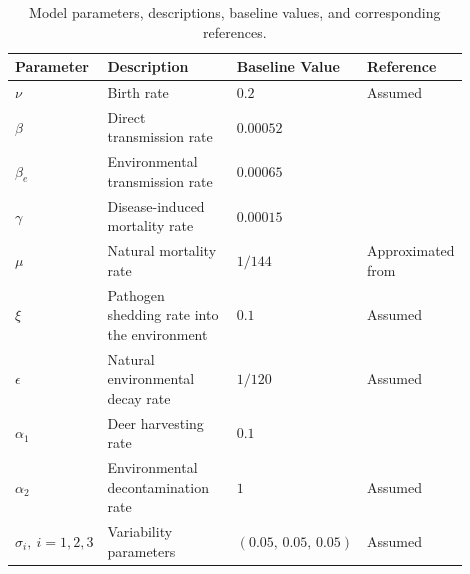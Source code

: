 \documentclass[12pt,a4paper,reqno]{amsart}
\theoremstyle{definition}
\theoremstyle{remark}
\theoremstyle{plain}
\begin{document}
\begin{table}[H]
\centering
\caption{Model parameters, descriptions, baseline values, and corresponding references.}
\label{tab:parameters}

\begin{tabular}{|p{0.15\linewidth}|p{0.40\linewidth}|p{0.18\linewidth}|p{0.17\linewidth}|}
\hline
\textbf{Parameter} &
\textbf{Description} &
\textbf{Baseline Value} &
\textbf{Reference}
\\
\hline

$\nu$ & Birth rate & $0.2$ & Assumed \\
\hline

$\beta$ & Direct transmission rate & $0.00052$ & \cite{Noelle2024} \\
\hline

$\beta_e$ & Environmental transmission rate & $0.00065$ & \cite{Noelle2024} \\
\hline

$\gamma$ & Disease-induced mortality rate & $0.00015$ & \cite{Noelle2024} \\
\hline

$\mu$ & Natural mortality rate & $1/144$ & Approximated from \cite{islam2022modeling} \\
\hline

$\xi$ & Pathogen shedding rate into the environment & $0.1$ & Assumed \\
\hline

$\epsilon$ & Natural environmental decay rate & $1/120$ & Assumed \\
\hline

$\alpha_1$ & Deer harvesting rate & $0.1$ & \cite{tpwd_deer_management} \\
\hline

$\alpha_2$ & Environmental decontamination rate & $1$ & Assumed \\
\hline




$\sigma_i,\ i=1,2,3$ & Variability parameters & $(0.05,\,0.05,\,0.05)$ & Assumed \\
\hline

\end{tabular}
\end{table}
\end{document}
